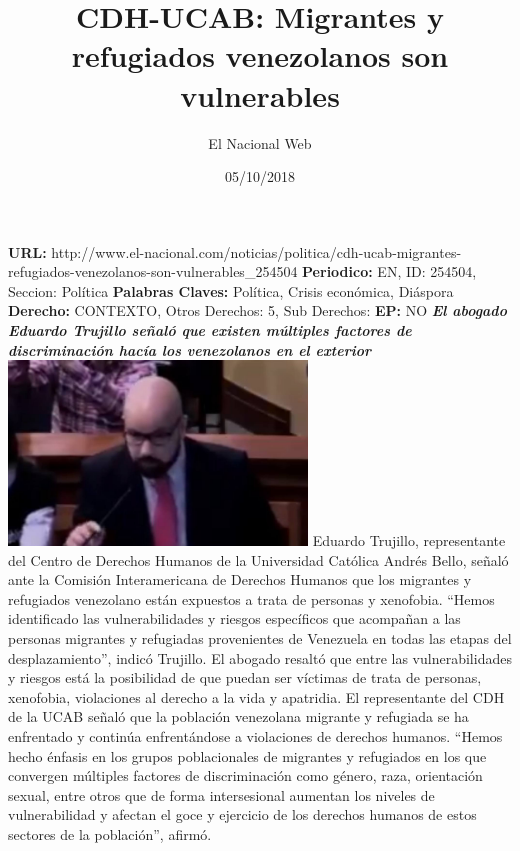 \documentclass{article}%
\title{\textbf{CDH{-}UCAB: Migrantes y refugiados venezolanos son vulnerables}}%
\author{El Nacional Web}%
\date{05/10/2018}%
\begin{document}
%
\normalsize%
\maketitle%
\textbf{URL: }%
http://www.el{-}nacional.com/noticias/politica/cdh{-}ucab{-}migrantes{-}refugiados{-}venezolanos{-}son{-}vulnerables\_254504\newline%
%
\textbf{Periodico: }%
EN, %
ID: %
254504, %
Seccion: %
Política\newline%
%
\textbf{Palabras Claves: }%
Política, Crisis económica, Diáspora\newline%
%
\textbf{Derecho: }%
CONTEXTO, %
Otros Derechos: %
5, %
Sub Derechos: %
\newline%
%
\textbf{EP: }%
NO\newline%
\newline%
%
\textbf{\textit{El abogado Eduardo Trujillo señaló que existen múltiples factores de discriminación hacía los venezolanos en el exterior~}}%
\newline%
\newline%
%
\includegraphics[width=300px]{100.jpg}%
\newline%
%
Eduardo Trujillo, representante del Centro de Derechos Humanos de la Universidad Católica Andrés Bello, señaló ante la Comisión Interamericana de Derechos Humanos que los migrantes y refugiados venezolano están expuestos a trata de personas y xenofobia.%
\newline%
%
“Hemos identificado las vulnerabilidades y riesgos específicos que acompañan a las personas migrantes y refugiadas provenientes de Venezuela en todas las etapas del desplazamiento”, indicó Trujillo.%
\newline%
%
El abogado resaltó que entre las vulnerabilidades y riesgos está la posibilidad de que puedan ser víctimas de trata de personas, xenofobia, violaciones al derecho a la vida y apatridia.%
\newline%
%
El representante del CDH de la UCAB señaló que la población venezolana migrante y refugiada se ha enfrentado y continúa enfrentándose a violaciones de derechos humanos.%
\newline%
%
“Hemos hecho énfasis en los grupos poblacionales de migrantes y refugiados en los que convergen múltiples factores de discriminación como género, raza, orientación sexual, entre otros que de forma intersesional aumentan los niveles de vulnerabilidad y afectan el goce y ejercicio de los derechos humanos de estos sectores de la población”, afirmó.%
\newline%
%
\end{document}
